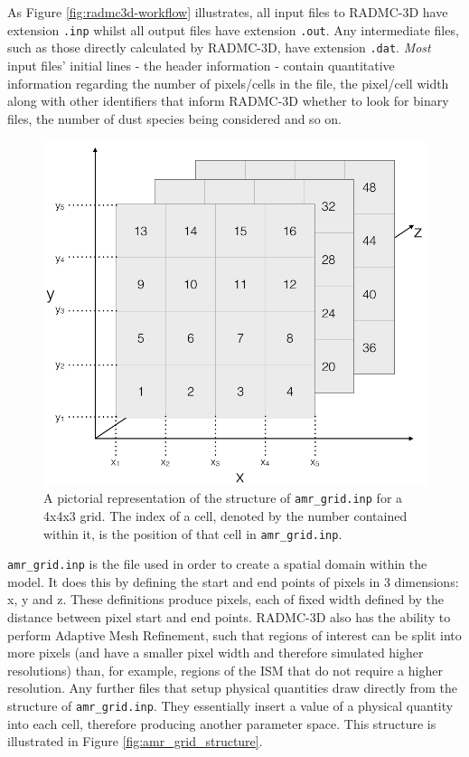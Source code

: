 \documentclass{report}
\begin{document}
As Figure \ref{fig:radmc3d-workflow} illustrates, all input files to RADMC-3D have extension \texttt{.inp} whilst all output files have extension \texttt{.out}. Any intermediate files, such as those directly calculated by RADMC-3D, have extension \texttt{.dat}. \textit{Most} input files' initial lines - the header information - contain quantitative information regarding the number of pixels/cells in the file, the pixel/cell width along with other identifiers that inform RADMC-3D whether to look for binary files, the number of dust species being considered and so on.

\begin{figure}
  \centering
  \includegraphics[scale=0.3]{../img/amr_grid_structure}
  \caption[A pictorial representation of the structure of \texttt{amr\_grid.inp} for a 4x4x3 grid. The index of a cell, denoted by the number contained within it, is the position of that cell in \texttt{amr\_grid.inp}.]{A pictorial representation of the structure of \texttt{amr\_grid.inp} for a 4x4x3 grid. The index of a cell, denoted by the number contained within it, is the position of that cell in \texttt{amr\_grid.inp}.}
\end{figure}\label{fig:amr_grid_structure}

\texttt{amr\_grid.inp} is the file used in order to create a spatial domain within the model. It does this by defining the start and end points of pixels in 3 dimensions: x, y and z. These definitions produce pixels, each of fixed width defined by the distance between pixel start and end points. RADMC-3D also has the ability to perform Adaptive Mesh Refinement, such that regions of interest can be split into more pixels (and have a smaller pixel width and therefore simulated higher resolutions) than, for example, regions of the ISM that do not require a higher resolution. Any further files that setup physical quantities draw directly from the structure of \texttt{amr\_grid.inp}. They essentially \textquotesingle insert \textquotesingle a value of a physical quantity into each cell, therefore producing another parameter space. This structure is illustrated in Figure \ref{fig:amr_grid_structure}.
\end{document}
